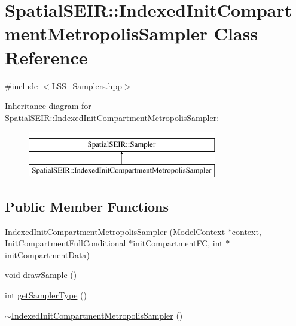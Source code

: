 \hypertarget{classSpatialSEIR_1_1IndexedInitCompartmentMetropolisSampler}{\section{Spatial\-S\-E\-I\-R\-:\-:Indexed\-Init\-Compartment\-Metropolis\-Sampler Class Reference}
\label{classSpatialSEIR_1_1IndexedInitCompartmentMetropolisSampler}
}


{\ttfamily \#include $<$L\-S\-S\-\_\-\-Samplers.\-hpp$>$}

Inheritance diagram for Spatial\-S\-E\-I\-R\-:\-:Indexed\-Init\-Compartment\-Metropolis\-Sampler\-:\begin{figure}[H]
\begin{center}
\leavevmode
\includegraphics[height=2.000000cm]{classSpatialSEIR_1_1IndexedInitCompartmentMetropolisSampler}
\end{center}
\end{figure}
\subsection*{Public Member Functions}
\begin{DoxyCompactItemize}
\item 
\hyperlink{classSpatialSEIR_1_1IndexedInitCompartmentMetropolisSampler_aea5ccff0662970405b7db26aca1f5f45}{Indexed\-Init\-Compartment\-Metropolis\-Sampler} (\hyperlink{classSpatialSEIR_1_1ModelContext}{Model\-Context} $\ast$\hyperlink{classSpatialSEIR_1_1IndexedInitCompartmentMetropolisSampler_a9cd2c0c4c1ac2a2c22fd977d79756173}{context}, \hyperlink{classSpatialSEIR_1_1InitCompartmentFullConditional}{Init\-Compartment\-Full\-Conditional} $\ast$\hyperlink{classSpatialSEIR_1_1IndexedInitCompartmentMetropolisSampler_a8c747dd4513ff2df6e5780b2f00cc99b}{init\-Compartment\-F\-C}, int $\ast$\hyperlink{classSpatialSEIR_1_1IndexedInitCompartmentMetropolisSampler_a5da3f9b3df2693b8b87530c261385d46}{init\-Compartment\-Data})
\item 
void \hyperlink{classSpatialSEIR_1_1IndexedInitCompartmentMetropolisSampler_ad8ee467d7679fa760db613075c9e0db2}{draw\-Sample} ()
\item 
int \hyperlink{classSpatialSEIR_1_1IndexedInitCompartmentMetropolisSampler_af2891523864f89b9587205eaba4bd41a}{get\-Sampler\-Type} ()
\item 
\hyperlink{classSpatialSEIR_1_1IndexedInitCompartmentMetropolisSampler_a079202d336eac83a21bc515e7ce70b07}{$\sim$\-Indexed\-Init\-Compartment\-Metropolis\-Sampler} ()
\end{DoxyCompactItemize}
